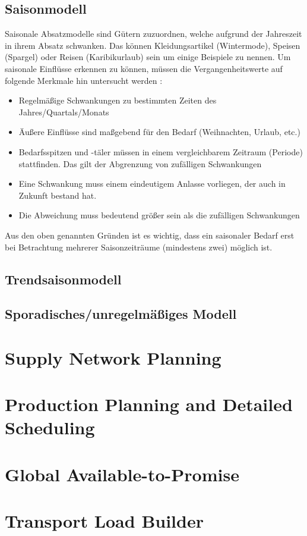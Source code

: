 \subsection{Saisonmodell}
Saisonale Absatzmodelle sind Gütern zuzuordnen, welche aufgrund der Jahreszeit in ihrem Absatz schwanken. Das können Kleidungsartikel (Wintermode), Speisen (Spargel) oder Reisen (Karibikurlaub) sein um einige Beispiele zu nennen.
Um saisonale Einflüsse erkennen zu können, müssen die Vergangenheitswerte auf folgende Merkmale hin untersucht werden \cite[S.~25]{Larouque2010}:
\begin{itemize}
	\item Regelmäßige Schwankungen zu bestimmten Zeiten des Jahres/Quartals/Monats
	\item Äußere Einflüsse sind maßgebend für den Bedarf (Weihnachten, Urlaub, etc.)
	\item Bedarfsspitzen und -täler müssen in einem vergleichbarem Zeitraum (Periode) stattfinden. Das gilt der Abgrenzung von zufälligen Schwankungen
	\item Eine Schwankung muss einem eindeutigem Anlasse vorliegen, der auch in Zukunft bestand hat.
	\item Die Abweichung muss bedeutend größer sein als die zufälligen Schwankungen
\end{itemize}
Aus den oben genannten Gründen ist es wichtig, dass ein saisonaler Bedarf erst bei Betrachtung mehrerer Saisonzeiträume (mindestens zwei) möglich ist.

\subsection{Trendsaisonmodell}
\subsection{Sporadisches/unregelmäßiges Modell}

\section{Supply Network Planning}
\cite[S.~169~ff]{Witt:2014:GrundkursSAPAPO}
\section{Production Planning and Detailed Scheduling}
\section{Global Available-to-Promise}
\section{Transport Load Builder}
